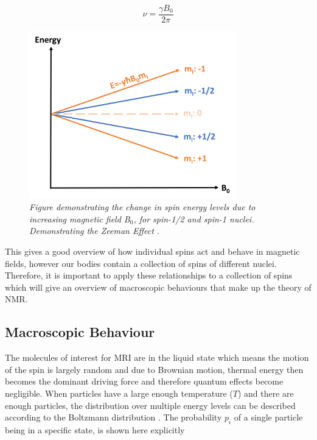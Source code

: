 \begin{equation}
    \nu = \frac{\gamma B_0}{2\pi}
    \label{eqn:theory:Lamor}
\end{equation}

\begin{figure}
    \centering
    \includegraphics[width=0.8\textwidth]{Figures/Theory/Zeeman.png}
    \caption{\textit{Figure demonstrating the change in spin energy levels due to increasing magnetic field B$_0$, for spin-1/2 and spin-1 nuclei. Demonstrating the Zeeman Effect \cite{Zeeman1896VerslagenAfdeeling}.}}
    \label{fig:theory:zeeman}
\end{figure}

This gives a good overview of how individual spins act and behave in magnetic fields, however our bodies contain a collection of spins of different nuclei. Therefore, it is important to apply these relationships to a collection of spins which will give an overview of macroscopic behaviours that make up the theory of \ac{NMR}.

\subsection{Macroscopic Behaviour}

The molecules of interest for \ac{MRI} are in the liquid state which means the motion of the spin is largely random and due to Brownian motion, thermal energy then becomes the dominant driving force and therefore quantum effects become negligible. When particles have a large enough temperature ($T$) and there are enough particles, the distribution over multiple energy levels can be described according to the Boltzmann distribution \cite{Boltzmann1872WeitereGasmolekulen}. The probability $p_i$ of a single particle being in a specific state, is shown here explicitly 

